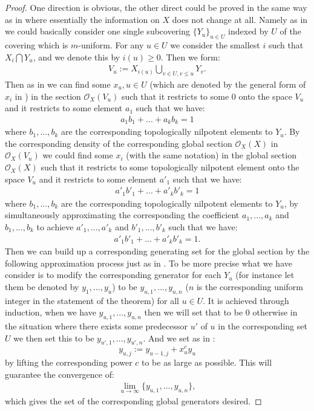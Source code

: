\documentclass[12pt]{amsart}
\theoremstyle{definition}
\numberwithin{equation}{section}
\begin{document}
\begin{proof}
One direction is obvious, the other direct could be proved in the same way as in \cite[Proposition 2.6.17]{KL2} where essentially the information on $X$ does not change at all. Namely as in \cite[Proposition 2.6.17]{KL2} we could basically consider one single subcovering $\{Y_u\}_{u\in U}$ indexed by $U$ of the covering which is $m$-uniform. For any $u\in U$ we consider the smallest $i$ such that $X_i\bigcap Y_u$, and we denote this by $i(u)\geq 0$. Then we form:
\begin{align}
V_{u}:=X_{i(u)}\bigcup_{v\in U,v\leq u} Y_{v}.	
\end{align}
Then as in \cite[Proposition 2.6.17]{KL2} we can find some $x_u,u\in U$ (which are denoted by the general form of $x_i$ in \cite[Proposition 2.6.17]{KL2}) in the section $\mathcal{O}_X(V_{u})$ such that it restricts to some $0$ onto the space $V_u$ and it restricts to some element $a_1$ such that we have:
\begin{align}
a_1b_1+...+a_kb_k=1	
\end{align}
where $b_1,...,b_k$ are the corresponding topologically nilpotent elements to $Y_u$. By the corresponding density of the corresponding global section $\mathcal{O}_X(X)$ in $\mathcal{O}_X(V_{u})$ we could find some $x_i$ (with the same notation) in the global section $\mathcal{O}_X(X)$ such that it restricts to some topologically nilpotent element onto the space $V_u$ and it restricts to some element $a'_1$ such that we have:
\begin{align}
a'_1b'_1+...+a'_kb'_k=1	
\end{align}
where $b_1,...,b_k$ are the corresponding topologically nilpotent elements to $Y_u$, by simultaneously approximating the corresponding the coefficient $a_1,...,a_k$ and $b_1,...,b_k$ to achieve $a'_1,...,a'_k$ and $b'_1,...,b'_k$ such that we have:
\begin{align}
a'_1b'_1+...+a'_kb'_k=1.	
\end{align}
Then we can build up a corresponding generating set for the global section by the following approximation process just as in \cite[Proposition 2.6.17]{KL2}. To be more precise what we have consider is to modify the corresponding generator for each $Y_u$ (for instance let them be denoted by $y_1,...,y_u$) to be $y_{u,1},...,y_{u,n}$ ($n$ is the corresponding uniform integer in the statement of the theorem) for all $u\in U$. It is achieved through induction, when we have $y_{u,1},...,y_{u,n}$ then we will set that to be $0$ otherwise in the situation where there exists some predecessor $u'$ of $u$ in the corresponding set $U$ we then set this to be $y_{u',1},...,y_{u',n}$. And we set as in \cite[Proposition 2.6.17]{KL2}:
\begin{displaymath}
y_{u,j}:=	y_{u-1,j}+x_u^cy_u
\end{displaymath}
by lifting the corresponding power $c$ to be as large as possible. This will guarantee the convergence of:
\begin{align}
\lim_{u\rightarrow \infty}\{y_{u,1},...,y_{u,n}\},	
\end{align}
which gives the set of the corresponding global generators desired.
\end{proof}
\end{document}
